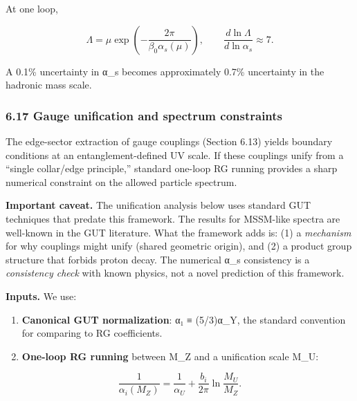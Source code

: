 \documentclass[
]{article}
\begin{document}
At one loop,

\[
\Lambda = \mu \exp\left(-\frac{2\pi}{\beta_0 \alpha_s(\mu)}\right),
\qquad
\frac{d \ln \Lambda}{d \ln \alpha_s} \approx 7.
\]

A 0.1\% uncertainty in α\_s becomes approximately 0.7\% uncertainty in
the hadronic mass scale.

\subsubsection{6.17 Gauge unification and spectrum
constraints}\label{gauge-unification-and-spectrum-constraints}

The edge-sector extraction of gauge couplings (Section 6.13) yields
boundary conditions at an entanglement-defined UV scale. If these
couplings unify from a ``single collar/edge principle,'' standard
one-loop RG running provides a sharp numerical constraint on the allowed
particle spectrum.

\textbf{Important caveat.} The unification analysis below uses standard
GUT techniques that predate this framework. The results for MSSM-like
spectra are well-known in the GUT literature. What the framework adds
is: (1) a \emph{mechanism} for why couplings might unify (shared
geometric origin), and (2) a product group structure that forbids proton
decay. The numerical α\_s consistency is a \emph{consistency check} with
known physics, not a novel prediction of this framework.

\textbf{Inputs.} We use:

\begin{enumerate}
\def\labelenumi{\arabic{enumi}.}
\item
  \textbf{Canonical GUT normalization}: α₁ ≡ (5/3)α\_Y, the standard
  convention for comparing to RG coefficients.
\item
  \textbf{One-loop RG running} between M\_Z and a unification scale
  M\_U:
\end{enumerate}

\[
   \frac{1}{\alpha_i(M_Z)} = \frac{1}{\alpha_U} + \frac{b_i}{2\pi}
   \ln\frac{M_U}{M_Z}.
\]
\end{document}

